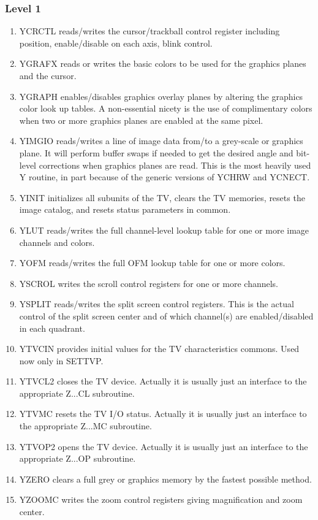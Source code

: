 \subsubsection{Level 1}
\begin{enumerate} %
\item YCRCTL reads/writes the cursor/trackball control
register including position, enable/disable on each axis, blink control.
\item YGRAFX reads or writes the basic colors to be used
for the graphics planes and the cursor.
\item YGRAPH enables/disables graphics overlay planes by
altering the graphics color look up tables.  A non-essential nicety is
the use of complimentary colors when two or more graphics planes are
enabled at the same pixel.
\item YIMGIO reads/writes a line of image data from/to a
grey-scale or graphics plane.  It will perform buffer swaps if needed
to get the desired angle and bit-level corrections when graphics planes
are read.  This is the most heavily used Y routine, in part because of the
generic versions of YCHRW and YCNECT.
\item YINIT initializes all subunits of the TV, clears the
TV memories, resets the image catalog, and resets status parameters in
common.
\item YLUT reads/writes the full channel-level lookup table
for one or more image channels and colors.
\item YOFM reads/writes the full OFM lookup table for one or
more colors.
\item YSCROL writes the scroll control registers for one or
more channels.
\item YSPLIT reads/writes the split screen control
registers.  This is the actual control of the split screen center and of
which channel(s) are enabled/disabled in each quadrant.
\item YTVCIN provides initial values for the TV
characteristics commons.  Used now only in SETTVP.
\item YTVCL2 closes the TV device.  Actually it is usually
just an interface to the appropriate Z...CL subroutine.
\item YTVMC resets the TV I/O status.  Actually it is usually
just an interface to the appropriate Z...MC subroutine.
\item YTVOP2 opens the TV device.  Actually it is usually just
an interface to the appropriate Z...OP subroutine.
\item YZERO clears a full grey or graphics memory by the
fastest possible method.
\item YZOOMC writes the zoom control registers giving
magnification and zoom center.

\end{enumerate} %
